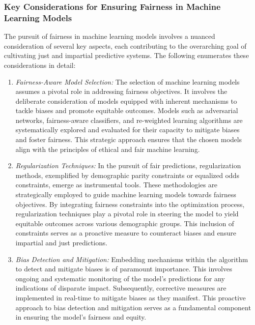 \subsubsection{Key Considerations for Ensuring Fairness in Machine Learning Models}

The pursuit of fairness in machine learning models involves a nuanced consideration of several key aspects, each contributing to the overarching goal of cultivating just and impartial predictive systems. The following enumerates these considerations in detail:

\begin{enumerate}
    
    \item \emph{Fairness-Aware Model Selection:} The selection of machine learning models assumes a pivotal role in addressing fairness objectives. It involves the deliberate consideration of models equipped with inherent mechanisms to tackle biases and promote equitable outcomes. Models such as adversarial networks, fairness-aware classifiers, and re-weighted learning algorithms are systematically explored and evaluated for their capacity to mitigate biases and foster fairness. This strategic approach ensures that the chosen models align with the principles of ethical and fair machine learning.

    \item \emph{Regularization Techniques:} In the pursuit of fair predictions, regularization methods, exemplified by demographic parity constraints or equalized odds constraints, emerge as instrumental tools. These methodologies are strategically employed to guide machine learning models towards fairness objectives. By integrating fairness constraints into the optimization process, regularization techniques play a pivotal role in steering the model to yield equitable outcomes across various demographic groups. This inclusion of constraints serves as a proactive measure to counteract biases and ensure impartial and just predictions.

    \item \emph{Bias Detection and Mitigation:} Embedding mechanisms within the algorithm to detect and mitigate biases is of paramount importance. This involves ongoing and systematic monitoring of the model's predictions for any indications of disparate impact. Subsequently, corrective measures are implemented in real-time to mitigate biases as they manifest. This proactive approach to bias detection and mitigation serves as a fundamental component in ensuring the model's fairness and equity.


\end{enumerate}
